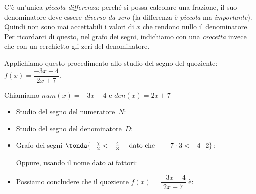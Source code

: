 C'è un'unica \emph{piccola differenza}: perché si possa calcolare una 
frazione, il suo denominatore deve essere \emph{diverso da zero} (la 
differenza è \emph{piccola} ma \emph{importante}). 
Quindi non sono mai accettabili i valori di \(x\) che rendono nullo il 
denominatore.
Per ricordarci di questo, nel grafo dei segni, indichiamo con una 
\emph{crocetta} invece che con un cerchietto gli zeri del denominatore.

\begin{esempio}{}{}
Applichiamo questo procedimento allo studio del segno del quoziente: \\
\(f(x)=\dfrac{-3x-4}{2x+7}\).

Chiamiamo \(num(x)=-3x-4\) \quad e \quad \(den(x)=2x+7\)

\begin{itemize} [noitemsep, left=0mm]
\item Studio del segno del numeratore~\(N\):\\
\hspace*{-5mm} 
\item Studio del segno del denominatore~\(D\):\\
\hspace*{-5mm} 
\item Grafo dei segni \(\tonda{-\frac{7}{2} < -\frac{4}{3}\quad 
\text{ dato che} \quad -7 \cdot 3 < -4 \cdot 2}\):

\immagine{}{\segnoquozientea}

Oppure, usando il nome dato ai fattori: 

\immagine{}{\segnoquozienteas}

\item Possiamo concludere che il quoziente 
\(f(x) = \dfrac{-3x-4}{2x+7}\) è:\\[.2em]
\begin{itemize} [noitemsep, left=0mm]
\end{itemize}
\end{itemize}
\end{esempio}

